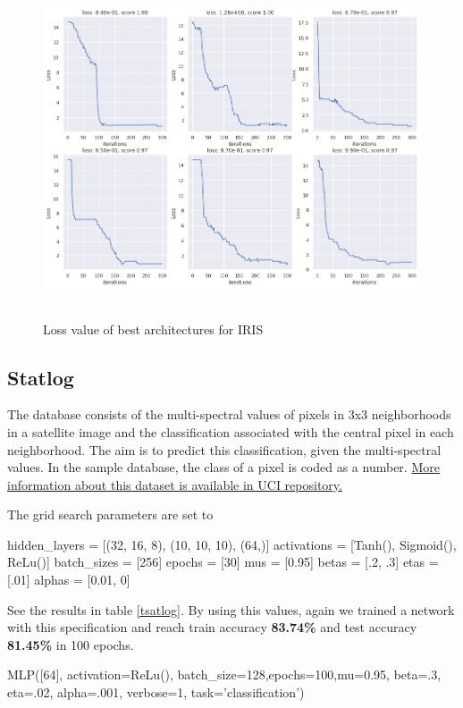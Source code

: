 \documentclass[10pt]{SelfArx} %
\begin{document}
	\begin{figure}\centering
		\includegraphics[width=1.79\columnwidth, height=10cm]{img/iris-plots1}
		\caption{Loss value of best architectures for IRIS}
		\label{firis}
	\end{figure}
	
	\subsection{Statlog}
	The database consists of the multi-spectral values of pixels in 3x3 neighborhoods in a satellite image and the classification associated with the central pixel in each neighborhood. The aim is to predict this classification, given the multi-spectral values. In the sample database, the class of a pixel is coded as a number. \href{https://archive.ics.uci.edu/ml/datasets/Statlog+(Landsat+Satellite)}{More information about this dataset is available in UCI repository.}
	
	The grid search parameters are set to
	
	\begin{python}
hidden_layers = [(32, 16, 8),
(10, 10, 10), (64,)]
activations = [Tanh(), Sigmoid(),
ReLu()]
batch_sizes = [256]
epochs = [30]
mus = [0.95]
betas = [.2, .3]
etas = [.01]
alphas = [0.01, 0]
\end{python}
	See the results in table \ref{tsatlog}. By using this values, again we trained a network with this specification and reach train accuracy \textbf{83.74\%} and test accuracy \textbf{81.45\%} in 100 epochs.
	
	\begin{python}
MLP([64], activation=ReLu(), 
batch_size=128,epochs=100,mu=0.95,
beta=.3, eta=.02, alpha=.001,
verbose=1, task='classification')
	\end{python}
	
\end{document}
